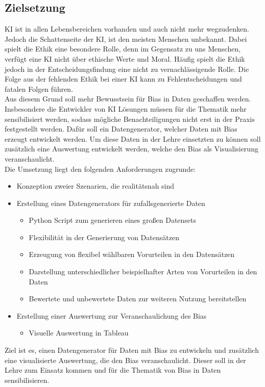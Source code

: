 \begin{onehalfspace}
    \newpage
    \section{Zielsetzung}
    \label{subsec:zielsetzung}
    \ac*{KI} ist in allen Lebensbereichen vorhanden und auch nicht mehr wegzudenken. Jedoch die Schattenseite der \ac*{KI}, ist den meisten Menschen unbekannt. Dabei spielt die Ethik eine besondere Rolle, denn im Gegensatz zu uns Menschen, verfügt eine \ac*{KI} nicht über ethische Werte und Moral. Häufig spielt die Ethik jedoch in der Entscheidungsfindung eine nicht zu vernachlässigende Rolle. Die Folge aus der fehlenden Ethik bei einer \ac*{KI} kann zu Fehlentscheidungen und fatalen Folgen führen.
    \\
    Aus diesem Grund soll mehr Bewusstsein für Bias in Daten geschaffen werden. Insbesondere die Entwickler von \ac*{KI} Lösungen müssen für die Thematik mehr sensibilisiert werden, sodass mögliche Benachteiligungen nicht erst in der Praxis festgestellt werden. Dafür soll ein Datengenerator, welcher Daten mit Bias erzeugt entwickelt werden. Um diese Daten in der Lehre einsetzten zu können soll zusätzlich eine Auswertung entwickelt werden, welche den Bias als Visualisierung veranschaulicht. 
    \\
    Die Umsetzung liegt den folgenden Anforderungen zugrunde:
    \begin{itemize}
        \item Konzeption zweier Szenarien, die realitätsnah sind
        \item Erstellung eines Datengenerators für zufallsgenerierte Daten
        \begin{itemize}
            \item Python Script zum generieren eines großen Datensets
            \item Flexibilität in der Generierung von Datensätzen
            \item Erzeugung von flexibel wählbaren Vorurteilen in den Datensätzen
            \item Darstellung unterschiedlicher beispielhafter Arten von Vorurteilen in den Daten
            \item Bewertete und unbewertete Daten zur weiteren Nutzung bereitstellen
        \end{itemize}
        \item Erstellung einer Auswertung zur Veranschaulichung des Bias
        \begin{itemize}
            \item Visuelle Auswertung in Tableau
        \end{itemize}
    \end{itemize} 
    Ziel ist es, einen Datengenerator für Daten mit Bias zu entwickeln und zusätzlich eine visualisierte Auswertung, die den Bias veranschaulicht. Dieser soll in der Lehre zum Einsatz kommen und für die Thematik von Bias in Daten sensibilisieren.


\end{onehalfspace}
